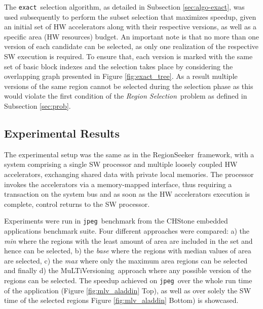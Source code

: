 \documentclass[]{usiinfthesis}
\newcommand{\rseeker}{{RegionSeeker}}
\newcommand{\multi}{MuLTiVersioning}
\newcommand{\plms}{{private local memories}}
\newcommand{\exact}{\texttt{exact}}
\newcommand{\jpeg}{\texttt{jpeg}}
\newcommand{\rsprobname}{\emph{Region Selection}}
\begin{document}
The \exact\ selection algorithm, as detailed in Subsection \ref{sec:algo-exact}, was used subsequently 
to perform the subset selection that maximizes speedup, 
given an initial set of HW accelerators along with their respective versions, as well as a specific 
area (HW resources) budget. An important note is that no more than one version of each candidate 
can be selected, as only one realization of the respective SW execution is required.
To ensure that, each version is marked with the same set of basic block indexes and the selection
takes place by considering the overlapping graph presented in Figure \ref{fig:exact_tree}.
As a result multiple versions of the same region cannot be selected during the selection phase as this 
would violate the first condition of the \rsprobname\ problem as defined in Subsection \ref{sec:prob}.


\subsection{Experimental Results}
\label{subsec:mv_res}

The experimental setup was the same as in the \rseeker\ framework, with a system comprising a single 
SW processor and multiple loosely coupled HW accelerators, exchanging shared data with \plms.
The processor invokes the accelerators via a memory-mapped
interface, thus requiring a transaction on the system bus and as soon as the HW accelerators execution is complete, control returns to the SW processor.\par

Experiments were run in \jpeg\ benchmark from the CHStone embedded applications benchmark suite.
Four different approaches were compared:
a) the \emph{min} where the regions with the least amount of area are included in the set
and hence can be selected, b) the \emph{base} 
where the regions with median values of area are selected, c) the \emph{max} where only the maximum 
area regions can be selected and finally d) the \multi\ approach where any possible version 
of the regions can be selected.
The speedup achieved on \jpeg\ over the whole run time of the application (Figure \ref{fig:mlv_aladdin} Top), 
as well as over solely the SW time of the selected regions Figure \ref{fig:mlv_aladdin} Bottom) is 
showcased.
\end{document}
